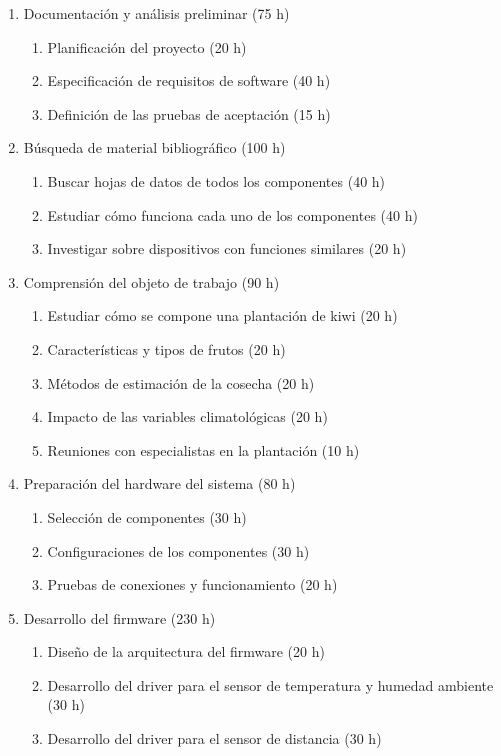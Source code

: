 \documentclass[
11pt, %
]{charter}
\begin{document}
\begin{enumerate}
\item Documentación y análisis preliminar (75 h)
	\begin{enumerate}
	\item Planificación del proyecto (20 h)
	\item Especificación de requisitos de software (40 h)
	\item Definición de las pruebas de aceptación (15 h)
	\end{enumerate}
\item Búsqueda de material bibliográfico (100 h)
	\begin{enumerate}
	\item Buscar hojas de datos de todos los componentes (40 h)
	\item Estudiar cómo funciona cada uno de los componentes (40 h)
	\item Investigar sobre dispositivos con funciones similares (20 h)
	\end{enumerate}
\item Comprensión del objeto de trabajo (90 h)
	\begin{enumerate}
	\item Estudiar cómo se compone una plantación de kiwi (20 h)
	\item Características y tipos de frutos (20 h)
	\item Métodos de estimación de la cosecha (20 h)
	\item Impacto de las variables climatológicas (20 h)
	\item Reuniones con especialistas en la plantación (10 h)
	\end{enumerate}
 \item Preparación del hardware del sistema (80 h)
	\begin{enumerate}
	\item Selección de componentes (30 h)
	\item Configuraciones de los componentes (30 h)
	\item Pruebas de conexiones y funcionamiento (20 h)
	\end{enumerate}
 \item Desarrollo del firmware (230 h)
	\begin{enumerate}
	\item Diseño de la arquitectura del firmware (20 h)
	\item Desarrollo del driver para el sensor de temperatura y humedad ambiente (30 h)
	\item Desarrollo del driver para el sensor de distancia (30 h)

\end{enumerate}
\end{enumerate}
\end{document}
